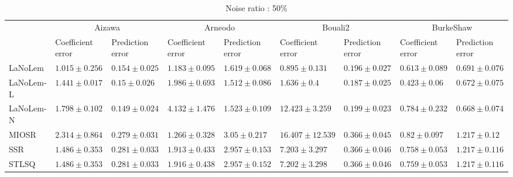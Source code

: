 \begin{table*}
\centering
\caption{Noise ratio : 50\%}
\label{}
\scalebox{0.7}
{
\begin{tabular}{lllllllll}
\toprule
 & \multicolumn{2}{c}{Aizawa} & \multicolumn{2}{c}{Arneodo} & \multicolumn{2}{c}{Bouali2} & \multicolumn{2}{c}{BurkeShaw} \\
 & Coefficient error & Prediction error & Coefficient error & Prediction error & Coefficient error & Prediction error & Coefficient error & Prediction error \\
\midrule
LaNoLem & $\mathbf{1.015}\pm 0.256$ & $0.154\pm 0.025$ & $\mathbf{1.183}\pm 0.095$ & $1.619\pm 0.068$ & $\mathbf{0.895}\pm 0.131$ & $0.196\pm 0.027$ & $0.613\pm 0.089$ & $0.691\pm 0.076$ \\
LaNoLem-L & $1.441\pm 0.017$ & $0.15\pm 0.026$ & $1.986\pm 0.693$ & $\mathbf{1.512}\pm 0.086$ & $1.636\pm 0.4$ & $\mathbf{0.187}\pm 0.025$ & $\mathbf{0.423}\pm 0.06$ & $0.672\pm 0.075$ \\
LaNoLem-N & $1.798\pm 0.102$ & $\mathbf{0.149}\pm 0.024$ & $4.132\pm 1.476$ & $1.523\pm 0.109$ & $12.423\pm 3.259$ & $0.199\pm 0.023$ & $0.784\pm 0.232$ & $\mathbf{0.668}\pm 0.074$ \\
MIOSR & $2.314\pm 0.864$ & $0.279\pm 0.031$ & $1.266\pm 0.328$ & $3.05\pm 0.217$ & $16.407\pm 12.539$ & $0.366\pm 0.045$ & $0.82\pm 0.097$ & $1.217\pm 0.12$ \\
SSR & $1.486\pm 0.353$ & $0.281\pm 0.033$ & $1.913\pm 0.433$ & $2.957\pm 0.153$ & $7.203\pm 3.297$ & $0.366\pm 0.046$ & $0.758\pm 0.053$ & $1.217\pm 0.116$ \\
STLSQ & $1.486\pm 0.353$ & $0.281\pm 0.033$ & $1.916\pm 0.438$ & $2.957\pm 0.152$ & $7.202\pm 3.298$ & $0.366\pm 0.046$ & $0.759\pm 0.053$ & $1.217\pm 0.116$ \\

\midrule


\end{tabular}}
\end{table*}
